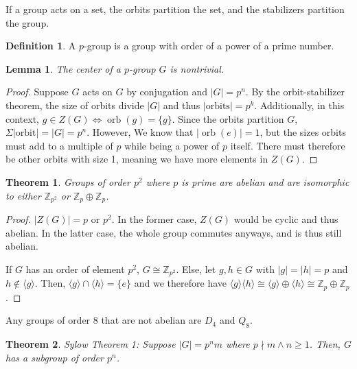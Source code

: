 \documentclass{article}
\theoremstyle{definition}
\newtheorem{definition}{Definition}
\theoremstyle{plain}
\newtheorem{theorem}{Theorem}
\theoremstyle{corollary}
\theoremstyle{lemma}
\newtheorem{lemma}{Lemma}
\DeclareMathOperator{\orb}{orb}
\begin{document}
If a group acts on a set, the orbits partition the set, and the stabilizers partition the group.

\begin{definition}
    A $p$-group is a group with order of a power of a prime number.
\end{definition}

\begin{lemma}
    The center of a $p$-group $G$ is nontrivial.
\end{lemma}

\begin{proof}
    Suppose $G$ acts on $G$ by conjugation and $|G|=p^n$.
    By the orbit-stabilizer theorem, the size of orbits divide $|G|$ and thus $|\text{orbits}|=p^k$.
    Additionally, in this context, $g\in Z(G)\iff\orb(g)=\{g\}$.
    Since the orbits partition $G$, $\Sigma|\text{orbit}|=|G|=p^n$. However, We know that $|\orb(e)|=1$, but the sizes orbits must add to a multiple of $p$ while being a power of $p$ itself. There must therefore be other orbits with size 1, meaning we have more elements in $Z(G)$.
\end{proof}

\begin{theorem}
    Groups of order $p^2$ where $p$ is prime are abelian and are isomorphic to either $\mathbb{Z}_{p^2}$ or $\mathbb{Z}_p\oplus\mathbb{Z}_p$.
\end{theorem}

\begin{proof}
    $|Z(G)|=p$ or $p^2$. In the former case, $Z(G)$ would be cyclic and thus abelian. In the latter case, the whole group commutes anyways, and is thus still abelian.

    If $G$ has an order of element $p^2$, $G\cong\mathbb Z_{p^2}$. Else, let $g,h\in G$ with $|g|=|h|=p$ and $h\notin\langle g\rangle$. Then, $\langle g\rangle\cap\langle h\rangle=\{e\}$ and we therefore have $\langle g\rangle\langle h\rangle\cong\langle g\rangle\oplus\langle h\rangle\cong\mathbb Z_p\oplus\mathbb Z_p$.
\end{proof}

Any groups of order 8 that are not abelian are $D_4$ and $Q_8$.

\begin{theorem}
    Sylow Theorem 1: Suppose $|G|=p^nm$ where $p\nmid m\land n\geq1$. Then, $G$ has a subgroup of order $p^n$.
\end{theorem}
\end{document}
